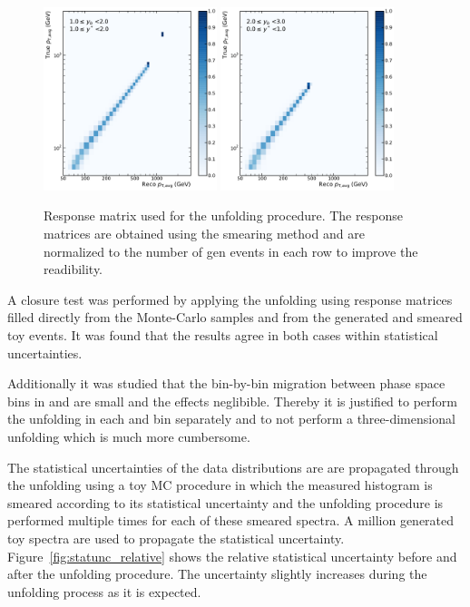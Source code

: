 \begin{figure}[htp]
    \includegraphics[width=0.45\textwidth]{figures/measurement/res_matrix_ptavg_normalized_yb1ys1.pdf}\hfill
    \includegraphics[width=0.45\textwidth]{figures/measurement/res_matrix_ptavg_normalized_yb2ys0.pdf}
    \caption{Response matrix used for the unfolding procedure. The response matrices are obtained
            using the smearing method and are normalized to the number of gen events in each row to improve
            the readibility.}
    \label{fig:res_matrix}
\end{figure}

A closure test was performed by applying the unfolding using response matrices
filled directly from the Monte-Carlo samples and from the generated and smeared
toy events. It was found that the results agree in both cases within statistical
uncertainties.

Additionally it was studied that the bin-by-bin migration between phase space
bins in \ystar and \yboost are small and the effects neglibible. Thereby it is
justified to perform the unfolding in each \ystar and \yboost bin separately and
to not perform a three-dimensional unfolding which is much more cumbersome.

The statistical uncertainties of the data distributions are are propagated
through the unfolding using a toy MC procedure in which the measured histogram
is smeared according to its statistical uncertainty and the unfolding procedure
is performed multiple times for each of these smeared spectra. A million
generated toy spectra are used to propagate the statistical uncertainty.
Figure~\ref{fig:statunc_relative} shows the relative statistical uncertainty before and
after the unfolding procedure. The uncertainty slightly increases during the unfolding
process as it is expected.

